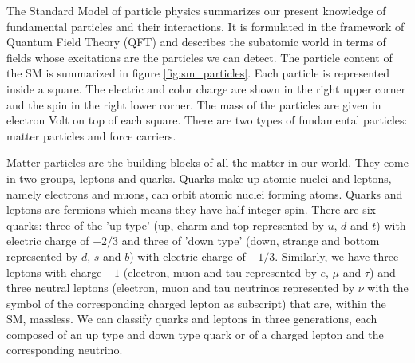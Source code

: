 %
%

The Standard Model of particle physics summarizes our present knowledge of fundamental particles and their interactions. It is formulated in the framework of Quantum Field Theory (QFT) and describes the subatomic world in terms of fields whose excitations are the particles we can detect. The particle content of the SM is summarized in figure \ref{fig:sm_particles}. Each particle is represented inside a square. The electric and color charge are shown in the right upper corner and the spin in the right lower corner. The mass of the particles are given in electron Volt on top of each square. There are two types of fundamental particles: matter particles and force carriers. 

Matter particles are the building blocks of all the matter in our world. They come in two groups, leptons and quarks. Quarks make up atomic nuclei and leptons, namely electrons and muons, can orbit atomic nuclei forming atoms. Quarks and leptons are fermions which means they have half-integer spin. There are six quarks: three of the 'up type' (up, charm and top represented by $u$, $d$ and $t$) with electric charge of $+2/3$ and three of 'down type' (down, strange and bottom represented by $d$, $s$ and $b$) with electric charge of $-1/3$. Similarly, we have three leptons with charge $-1$ (electron, muon and tau represented by $e$, $\mu$ and $\tau$) and three neutral leptons (electron, muon and tau neutrinos represented by $\nu$ with the symbol of the corresponding charged lepton as subscript) that are, within the SM, massless. We can classify quarks and leptons in three generations, each composed of an up type and down type quark or of a charged lepton and the corresponding neutrino.

